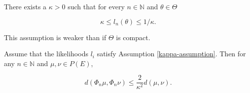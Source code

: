 \begin{assumption}\label{kappa-assumption}
  There exists a $\kappa > 0$ such that for every $n \in \mathbb{N}$ and $\theta \in \Theta$

  \begin{equation*}
    \kappa \leq l_n(\theta) \leq 1/\kappa.
  \end{equation*}

  This assumption is weaker than  if $\Theta$ is compact.
\end{assumption}

\begin{lemma} \label{seq-bound}
  Assume that the likelihoods $l_i$ satisfy Assumption \ref{kappa-assumption}. Then for any $n \in \mathbb{N}$ and $\mu, \nu \in P(E)$,

  \begin{equation*}
    d(\Phi_n\mu, \Phi_n\nu) \leq \frac2{\kappa^2}d(\mu, \nu).
  \end{equation*}
\end{lemma}

